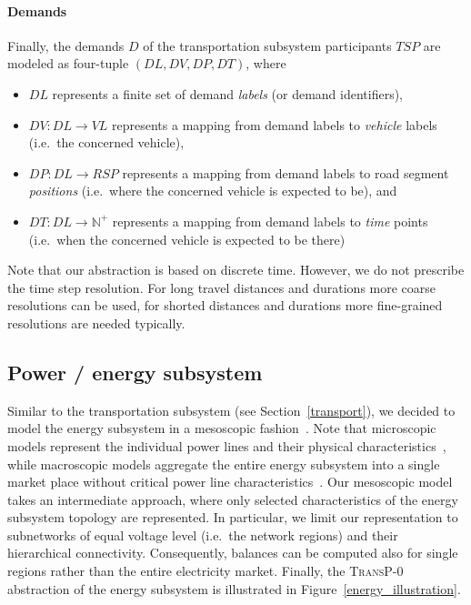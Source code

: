 \paragraph{Demands}
\label{demands}

Finally, the demands $D$ of the transportation subsystem participants $TSP$ are modeled as four-tuple $(DL, DV, DP, DT)$, where
\begin{itemize}
	\item $DL$ represents a finite set of demand \textit{labels} (or demand identifiers),
	\item $DV: DL \rightarrow VL$ represents a mapping from demand labels to \textit{vehicle} labels (i.e.\ the concerned vehicle),
	\item $DP: DL \rightarrow RSP$ represents a mapping from demand labels to road segment \textit{positions} (i.e.\ where the concerned vehicle is expected to be), and
	\item $DT: DL \rightarrow \mathbb{N}^+$ represents a mapping from demand labels to \textit{time} points (i.e.\ when the concerned vehicle is expected to be there)
\end{itemize}
Note that our abstraction is based on discrete time. However, we do not prescribe the time step resolution. For long travel distances and durations more coarse resolutions can be used, for shorted distances and durations more fine-grained resolutions are needed typically.

\subsection{Power / energy subsystem}
\label{energy_system}

Similar to the transportation subsystem (see Section~\ref{transport}), we decided to model the energy subsystem in a mesoscopic fashion~\cite{Hackenberg2012}. Note that microscopic models represent the individual power lines and their physical characteristics~\cite{Dommel1968}, while macroscopic models aggregate the entire energy subsystem into a single market place without critical power line characteristics~\cite{Castronuovo2004}. Our mesoscopic model takes an intermediate approach, where only selected characteristics of the energy subsystem topology are represented. In particular, we limit our representation to subnetworks of equal voltage level (i.e.\ the network regions) and their hierarchical connectivity. Consequently, balances can be computed also for single regions rather than the entire electricity market. Finally, the \textsc{TransP-0} abstraction of the energy subsystem is illustrated in Figure~\ref{energy_illustration}.

